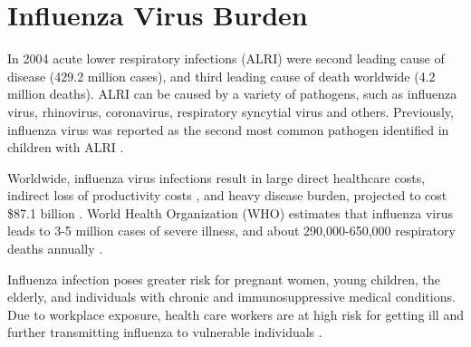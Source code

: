 \section{Influenza Virus Burden}

In 2004 acute lower respiratory infections (ALRI) were second leading cause of disease (429.2 million cases), and third leading cause of death worldwide \cite{world2008global} (4.2 million deaths). ALRI can be caused by a variety of pathogens, such as influenza virus, rhinovirus, coronavirus, respiratory syncytial virus and others. Previously, influenza virus was reported as the second most common pathogen identified in children with ALRI \cite{nair2011global}.

Worldwide, influenza virus infections result in large direct healthcare costs, indirect loss of productivity costs \cite{de2015systematic}, and heavy disease burden, projected to cost \$87.1 billion \cite{molinari2007annual}. World Health Organization (WHO) estimates that influenza virus leads to 3-5 million cases of severe illness, and about 290,000-650,000 respiratory deaths annually \cite{influenza_seasonal_2018}.

Influenza infection poses greater risk for pregnant women, young children, the elderly, and individuals with chronic and immunosuppressive medical conditions. Due to workplace exposure, health care workers are at high risk for getting ill and further transmitting influenza to vulnerable individuals \cite{influenza_seasonal_2018}.